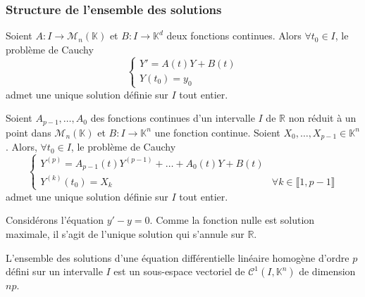 	\subsubsection{Structure de l'ensemble des solutions}


	\begin{theorem}
		Soient $A : I \rightarrow \mathcal{M}_n(\mathbb{K})$ et $B : I \rightarrow \mathbb{K}^d$ deux fonctions continues. Alors $\forall t_0 \in I$, le problème de Cauchy
		\[ \begin{cases} Y' = A(t)Y + B(t) \\ Y(t_0) = y_0 \end{cases} \]
		admet une unique solution définie sur $I$ tout entier.
	\end{theorem}


	\begin{remark}
		Soient $A_{p-1}, \dots, A_0$ des fonctions continues d'un intervalle $I$ de $\mathbb{R}$ non réduit à un point dans $\mathcal{M}_n(\mathbb{K})$ et $B : I \rightarrow \mathbb{K}^n$ une fonction continue. Soient $X_0, \dots, X_{p-1} \in \mathbb{K}^n$. Alors, $\forall t_0 \in I$, le problème de Cauchy
		\[ \begin{cases} Y^{(p)} = A_{p-1}(t) Y^{(p-1)} + \dots + A_0(t) Y + B(t) & \\ Y^{(k)}(t_0) = X_k & \forall k \in \llbracket 1, p-1 \rrbracket \end{cases} \]
		admet une unique solution définie sur $I$ tout entier.
	\end{remark}


	\begin{example}
		Considérons l'équation $y' - y = 0$. Comme la fonction nulle est solution maximale, il s'agit de l'unique solution qui s'annule sur $\mathbb{R}$.
	\end{example}


	\begin{corollary}
		L'ensemble des solutions d'une équation différentielle linéaire homogène d'ordre $p$ défini sur un intervalle $I$ est un sous-espace vectoriel de $\mathcal{C}^1 (I, \mathbb{K}^n)$ de dimension $np$.
	\end{corollary}

